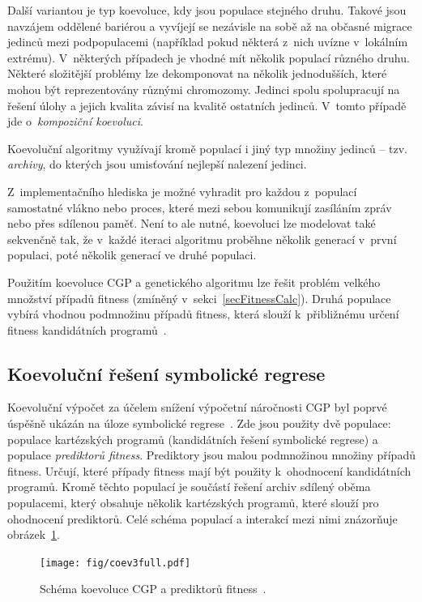 Další variantou je typ koevoluce, kdy jsou populace stejného druhu. Takové jsou navzájem oddělené bariérou a vyvíjejí se nezávisle na sobě až na občasné migrace jedinců mezi podpopulacemi (například pokud některá z~nich uvízne v~lokálním extrému). V~některých případech je vhodné mít několik populací různého druhu. Některé složitější problémy lze dekomponovat na několik jednodušších, které mohou být reprezentovány různými chromozomy. Jedinci spolu spolupracují na řešení úlohy a jejich kvalita závisí na kvalitě ostatních jedinců. V~tomto případě jde o~\emph{kompoziční koevoluci}.

Koevoluční algoritmy využívají kromě populací i jiný typ množiny jedinců -- tzv. \emph{archivy}, do kterých jsou umisťování nejlepší nalezení jedinci.

Z~implementačního hlediska je možné vyhradit pro každou z~populací samostatné vlákno nebo proces, které mezi sebou komunikují zasíláním zpráv nebo přes sdílenou paměť. Není to ale nutné, koevoluci lze modelovat také sekvenčně tak, že v~každé iteraci algoritmu proběhne několik generací v~první populaci, poté několik generací ve druhé populaci.

Použitím koevoluce CGP a genetického algoritmu lze řešit problém velkého množství případů fitness (zmíněný v~sekci~\ref{secFitnessCalc}). Druhá populace vybírá vhodnou podmnožinu případů fitness, která slouží k~přibližnému určení fitness kandidátních programů~\cite{SikuPPSN}.


\subsection{Koevoluční řešení symbolické regrese}

Koevoluční výpočet za účelem snížení výpočetní náročnosti CGP byl poprvé úspěšně ukázán na úloze symbolické regrese~\cite{SikuEuroGP}. Zde jsou použity dvě populace: populace kartézských programů (kandidátních řešení symbolické regrese) a populace \emph{prediktorů fitness}. Prediktory jsou malou podmnožinou množiny případů fitness. Určují, které případy fitness mají být použity k~ohodnocení kandidátních programů. Kromě těchto populací je součástí řešení archiv sdílený oběma populacemi, který obsahuje několik kartézských programů, které slouží pro ohodnocení prediktorů. Celé schéma populací a interakcí mezi nimi znázorňuje obrázek~\ref{obrKoevoluce}.

\begin{figure}[htb]
    \baselineskip
    \centering\texttt{[image: fig/coev3full.pdf]}
    \caption{Schéma koevoluce CGP a prediktorů fitness~\cite{SikuEuroGP}.}
    \label{obrKoevoluce}
\end{figure}

